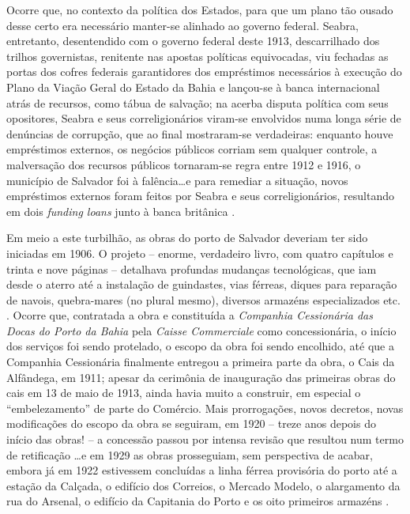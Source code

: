 Ocorre que, no contexto da política dos Estados, para que um plano tão ousado desse certo era necessário manter-se alinhado ao governo federal. Seabra, entretanto, desentendido com o governo federal deste 1913, descarrilhado dos trilhos governistas, renitente nas apostas políticas equivocadas, viu fechadas as portas dos cofres federais garantidores dos empréstimos necessários à execução do Plano da Viação Geral do Estado da Bahia e lançou-se à banca internacional atrás de recursos, como tábua de salvação; na acerba disputa política com seus opositores, Seabra e seus correligionários viram-se envolvidos numa longa série de denúncias de corrupção, que ao final mostraram-se verdadeiras: enquanto houve empréstimos externos, os negócios públicos corriam sem qualquer controle, a malversação dos recursos públicos tornaram-se regra entre 1912 e 1916, o município de Salvador foi à falência\dots e para remediar a situação, novos empréstimos externos foram feitos por Seabra e seus correligionários, resultando em dois \textit{funding loans} junto à banca britânica \cite[pp.~217-221]{joaci_porto_2016}.

Em meio a este turbilhão, as obras do porto de Salvador deveriam ter sido iniciadas em 1906. O projeto -- enorme, verdadeiro livro, com quatro capítulos e trinta e nove páginas -- detalhava profundas mudanças tecnológicas, que iam desde o aterro até a instalação de guindastes, vias férreas, diques para reparação de navois, quebra-mares (no plural mesmo), diversos armazéns especializados etc. \cite[p.~186]{rosado_porto_2016}. Ocorre que, contratada a obra e constituída a \textit{Companhia Cessionária das Docas do Porto da Bahia} pela \textit{Caisse Commerciale} como concessionária, o início dos serviços foi sendo protelado, o escopo da obra foi sendo encolhido, até que a Companhia Cessionária finalmente entregou a primeira parte da obra, o Cais da Alfândega, em 1911; apesar da cerimônia de inauguração das primeiras obras do cais em 13 de maio de 1913, ainda havia muito a construir, em especial o ``embelezamento'' de parte do Comércio. Mais prorrogações, novos decretos, novas modificações do escopo da obra se seguiram, em 1920 -- treze anos depois do início das obras! -- a concessão passou por intensa revisão que resultou num termo de retificação \dots e em 1929 as obras prosseguiam, sem perspectiva de acabar, embora já em 1922 estivessem concluídas a linha férrea provisória do porto até a estação da Calçada, o edifício dos Correios, o Mercado Modelo, o alargamento da rua do Arsenal, o edifício da Capitania do Porto e os oito primeiros armazéns \cite[p.~186-196]{rosado_porto_2016}. 

